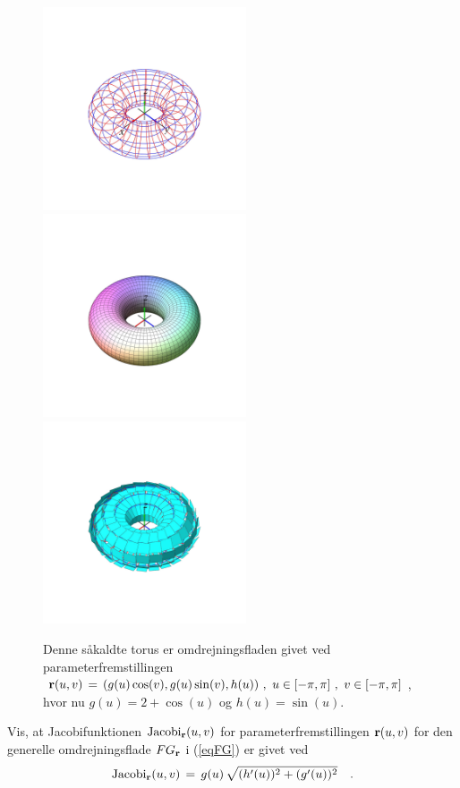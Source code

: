 \begin{figure}[h]
\centerline{\includegraphics[height=60mm]{FIGS/plotTorus1} \includegraphics[height=60mm]{FIGS/plotTorus2} \includegraphics[height=60mm]{FIGS/plotTorus3}}
\begin{center}
\caption{\small{Denne {såkaldte torus} er omdrejningsfladen
givet ved parameterfremstillingen ${\bf r}(u, v)
\, = \, (g(u)\cos(v), g(u)\sin(v), h(u)) \,\,,
\,\, u \in [-\pi, \pi ]\,\, , \, \, v \in [-\pi,
\pi]$, hvor nu $g(u) = 2 + \cos(u)$ og $h(u) =
\sin(u)$.}} \label{figTorus12}
\end{center}
\end{figure}

\begin{exercise}
Vis, at Jacobifunktionen $\operatorname{Jacobi}_{{\bf r}}(u,v)$
for parameterfremstillingen ${\bf r}(u,v)$ for
den generelle omdrejningsflade $FG_{{\bf r}}$  i
(\ref{eqFG}) er givet ved
\begin{equation}
\operatorname{Jacobi}_{{\bf r}}(u,v)\, = \,
g(u)\,\sqrt{(h'(u))^{2} + (g'(u))^{2}} \quad .
\end{equation}
\end{exercise}



